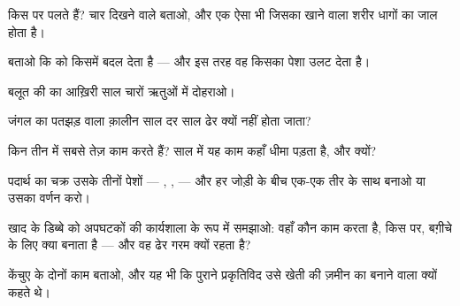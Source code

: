 \begin{exercise}[$\star$]\label{exo:g6:decomposers-and-soil:2}
 किस पर पलते हैं? चार दिखने वाले  बताओ, और एक ऐसा भी जिसका
खाने वाला शरीर धागों का जाल होता है।
\end{exercise}

\begin{exercise}[$\star$]\label{exo:g6:decomposers-and-soil:3}
बताओ कि   को किसमें बदल देता है --- और इस तरह वह
किसका पेशा उलट देता है।
\end{exercise}

\begin{exercise}[$\star$]\label{exo:g6:decomposers-and-soil:4}
बलूत की  का आख़िरी साल चारों ऋतुओं में दोहराओ।
\end{exercise}

\begin{exercise}[$\star$]\label{exo:g6:decomposers-and-soil:5}
जंगल का पतझड़ वाला क़ालीन साल दर साल ढेर क्यों नहीं होता जाता?
\end{exercise}

\begin{exercise}[$\star$]\label{exo:g6:decomposers-and-soil:6}
 किन तीन  में सबसे तेज़ काम करते हैं? साल में यह काम
कहाँ धीमा पड़ता है, और क्यों?
\end{exercise}

\begin{exercise}[$\star\star$]\label{exo:g6:decomposers-and-soil:7}
पदार्थ का चक्र उसके तीनों पेशों --- , ,  --- और
हर जोड़ी के बीच एक-एक तीर के साथ बनाओ या उसका वर्णन करो।
\end{exercise}

\begin{exercise}[$\star\star$]\label{exo:g6:decomposers-and-soil:8}
खाद के डिब्बे को अपघटकों की कार्यशाला के रूप में समझाओ: वहाँ कौन काम
करता है, किस पर, बग़ीचे के लिए क्या बनाता है --- और वह ढेर गरम क्यों
रहता है?
\end{exercise}

\begin{exercise}[$\star\star$]\label{exo:g6:decomposers-and-soil:9}
केंचुए के दोनों काम बताओ, और यह भी कि पुराने प्रकृतिविद उसे खेती की
ज़मीन का बनाने वाला क्यों कहते थे।
\end{exercise}

